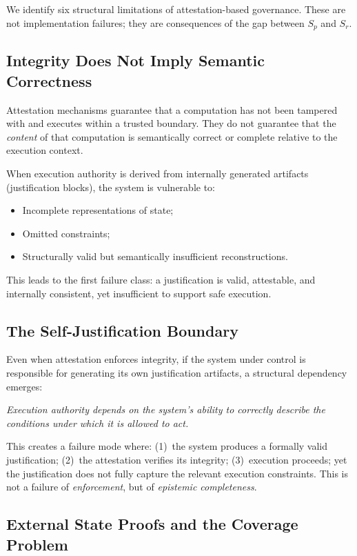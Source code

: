 \documentclass[11pt]{article}
\newcommand{\Sr}{S_r}
\newcommand{\Sp}{S_p}
\begin{document}
We identify six structural limitations of attestation-based governance.
These are not implementation failures; they are consequences of the gap
between $\Sp$ and $\Sr$.

\subsection{Integrity Does Not Imply Semantic Correctness}

Attestation mechanisms guarantee that a computation has not been tampered with
and executes within a trusted boundary.
They do not guarantee that the \emph{content} of that computation is semantically
correct or complete relative to the execution context.

When execution authority is derived from internally generated artifacts (justification
blocks), the system is vulnerable to:
\begin{itemize}
  \item Incomplete representations of state;
  \item Omitted constraints;
  \item Structurally valid but semantically insufficient reconstructions.
\end{itemize}

This leads to the first failure class:
a justification is valid, attestable, and internally consistent, yet insufficient
to support safe execution.

\subsection{The Self-Justification Boundary}

Even when attestation enforces integrity, if the system under control is
responsible for generating its own justification artifacts, a structural
dependency emerges:

\begin{center}
\textit{Execution authority depends on the system's ability to correctly describe
the conditions under which it is allowed to act.}
\end{center}

This creates a failure mode where:
(1)~the system produces a formally valid justification;
(2)~the attestation verifies its integrity;
(3)~execution proceeds;
yet the justification does not fully capture the relevant execution constraints.
This is not a failure of \emph{enforcement}, but of \emph{epistemic completeness}.

\subsection{External State Proofs and the Coverage Problem}
\end{document}
